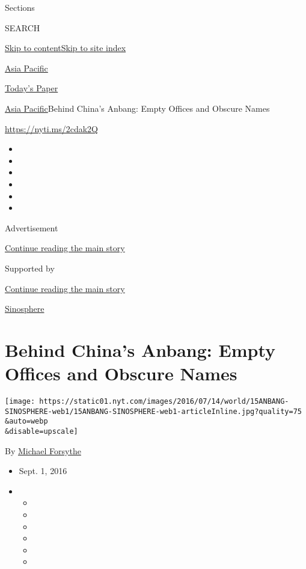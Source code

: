 Sections

SEARCH

\protect\hyperlink{site-content}{Skip to
content}\protect\hyperlink{site-index}{Skip to site index}

\href{https://www.nytimes.com/section/world/asia}{Asia Pacific}

\href{https://myaccount.nytimes.com/auth/login?response_type=cookie\&client_id=vi}{}

\href{https://www.nytimes.com/section/todayspaper}{Today's Paper}

\href{/section/world/asia}{Asia Pacific}\textbar{}Behind China's Anbang:
Empty Offices and Obscure Names

\url{https://nyti.ms/2cdak2Q}

\begin{itemize}
\item
\item
\item
\item
\item
\item
\end{itemize}

Advertisement

\protect\hyperlink{after-top}{Continue reading the main story}

Supported by

\protect\hyperlink{after-sponsor}{Continue reading the main story}

\href{/column/sinosphere}{Sinosphere}

\hypertarget{behind-chinas-anbang-empty-offices-and-obscure-names}{%
\section{Behind China's Anbang: Empty Offices and Obscure
Names}\label{behind-chinas-anbang-empty-offices-and-obscure-names}}

\texttt{[image: https://static01.nyt.com/images/2016/07/14/world/15ANBANG-SINOSPHERE-web1/15ANBANG-SINOSPHERE-web1-articleInline.jpg?quality=75\\\&auto=webp\\\&disable=upscale]}

By \href{http://www.nytimes.com/by/michael-forsythe}{Michael Forsythe}

\begin{itemize}
\item
  Sept. 1, 2016
\item
  \begin{itemize}
  \item
  \item
  \item
  \item
  \item
  \item
  \end{itemize}
\end{itemize}

